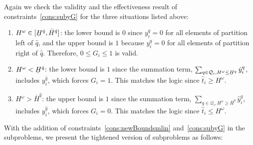 \documentclass[11pt]{article}
\renewcommand{\underbar}{\underaccent{\bar}}
\begin{document}
	Again we check the validity and the effectiveness result of constraints~\eqref{cons:subyG} for the three situations listed above:
	\begin{enumerate}
		\item 
		\(H^\omega \in [\underbar{H}^{\hat{q}},\bar{H}^{\hat{q}}]\): 
		the lower bound is \(0\) since \(y_i^q = 0\) for all elements of partition left of \(\hat{q}\), and the upper bound is \(1\) because \(y_i^q = 0\) for all elements of partition right of \(\hat{q}\). Therefore, \(0 \leq G_i \leq 1\) is valid.
		\item 
		\(H^\omega < \underbar{H}^{\hat{q}}\): 
		the lower bound is \(1\) since the summation term, 
		\(\sum_{q \in \mathcal{Q}_i, H^\omega \leq \underbar{H}^q} \hat{y}_i^q\), includes \(y_i^{\hat{q}}\), 
		which forces \(G_i = 1\). This matches the logic since \(\hat{t}_i \geq H^\omega\).
		\item 
		\(H^\omega > \bar{H}^{\hat{q}}\): the upper bound is \(1\) since the summation term, \(\sum_{q \in \mathcal{Q}_i, H^\omega \geq \bar{H}^q} \hat{y}_i^q\), includes \(y_i^{\hat{q}}\), which forces \(G_i = 0\). This matches the logic since \(\hat{t}_i \leq H^\omega\).
	\end{enumerate}
	With the addition of constraints~\eqref{cons:newBoundsmlin} and~\eqref{cons:subyG} in the subproblems, we present the tightened version of subproblems as follows: 
\end{document}
